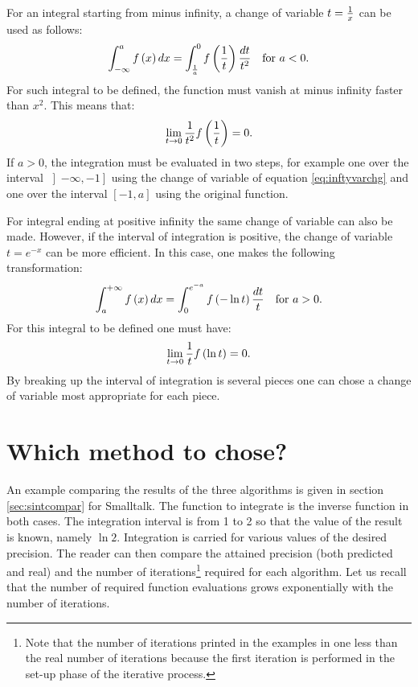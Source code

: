For an integral starting from minus infinity, a change of variable
$t={1 \over x}$ can be used as follows:
\begin{equation}
\label{eq:inftyvarchg}
  \int_{-\infty}^a f\left(x\right)dx= \int_{1\over a}^0 f\left({1\over
  t}\right){dt\over t^2}\mbox{\quad for $a<0$.}
\end{equation}
For such integral to be defined, the function must vanish at minus
infinity faster than $x^2$. This means that:
\begin{equation}
  \lim_{t \to 0}{1\over t^2}f\left({1\over
  t}\right)=0.
\end{equation}
If $a>0$, the integration must be evaluated in two steps, for
example one over the interval $\left]-\infty,-1\right]$ using the
change of variable of equation \ref{eq:inftyvarchg} and one over
the interval $\left[-1,a\right]$ using the original function.

For integral ending at positive infinity the same change of
variable can also be made. However, if the interval of integration
is positive, the change of variable $t=e^{-x}$ can be more
efficient. In this case, one makes the following transformation:
\begin{equation}
\int_a^{+\infty} f\left(x\right)dx=\int_0^{e^{-a}}f\left(-\ln t
\right){dt \over t}\mbox{\quad for $a>0$}.
\end{equation}
For this integral to be defined one must have:
\begin{equation}
  \lim_{t \to 0}{1\over t}f\left(\ln
  t\right)=0.
\end{equation}
By breaking up the interval of integration is several pieces one
can chose a change of variable most appropriate for each piece.

\section{Which method to chose?}
\label{sec:intwhich} An example comparing the results of the three
algorithms is given in section \ref{sec:sintcompar} for Smalltalk.
The function to integrate is the inverse function in both cases. The integration
interval is from 1 to 2 so that the value of the result is known,
namely $\ln 2$. Integration is carried for various values of the
desired precision. The reader can then compare the attained
precision (both predicted and real) and the number of
iterations\footnote{Note that the number of iterations printed in
the examples in one less than the real number of iterations
because the first iteration is performed in the set-up phase of
the iterative process.} required for each algorithm. Let us recall
that the number of required function evaluations grows
exponentially with the number of iterations.

